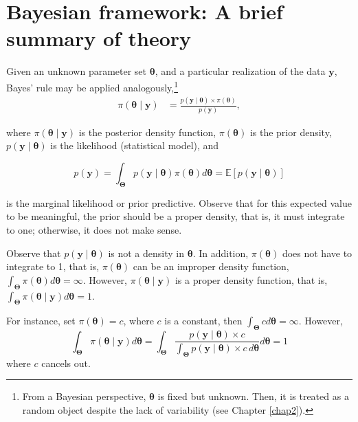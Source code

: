 \section{Bayesian framework: A brief summary of theory}\label{sec12}

Given an unknown parameter set \( \bm{\theta} \), and a particular realization of the data \( \mathbf{y} \), Bayes' rule may be applied analogously,\footnote{From a Bayesian perspective, \( \bm{\theta} \) is fixed but unknown. Then, it is treated as a random object despite the lack of variability (see Chapter \ref{chap2}).}
\begin{align}
	\pi(\bm{\theta}\mid \mathbf{y})&=\frac{p(\mathbf{y}\mid \bm{\theta}) \times \pi(\bm{\theta})}{p(\mathbf{y})},
	\label{eq:121}
\end{align}

where $\pi(\bm{\theta}\mid \mathbf{y})$ is the posterior density function, $\pi(\bm{\theta})$ is the prior density, $p(\mathbf{y}\mid \bm{\theta})$ is the likelihood (statistical model), and

\begin{equation}
	p(\mathbf{y})=\int_{\mathbf{\Theta}}p(\mathbf{y}\mid \bm{\theta})\pi(\bm{\theta})d\bm{\theta}=\mathbb{E}\left[p(\mathbf{y}\mid \bm{\theta})\right]
	\label{eq:121a}
\end{equation}

is the marginal likelihood or prior predictive. Observe that for this expected value to be meaningful, the prior should be a proper density, that is, it must integrate to one; otherwise, it does not make sense.


Observe that \( p(\mathbf{y} \mid \bm{\theta}) \) is not a density in \( \bm{\theta} \). In addition, \( \pi(\bm{\theta}) \) does not have to integrate to 1, that is, \( \pi(\bm{\theta}) \) can be an improper density function, \( \int_{\mathbf{\Theta}} \pi(\bm{\theta}) d\bm{\theta} = \infty \). However, \( \pi(\bm{\theta} \mid \mathbf{y}) \) is a proper density function, that is, \( \int_{\mathbf{\Theta}} \pi(\bm{\theta} \mid \mathbf{y}) d\bm{\theta} = 1 \). 

For instance, set \( \pi(\bm{\theta}) = c \), where \( c \) is a constant, then \( \int_{\mathbf{\Theta}} c d\bm{\theta} = \infty \). However,
\[
\int_{\mathbf{\Theta}} \pi(\bm{\theta} \mid \mathbf{y}) d\bm{\theta} = \int_{\mathbf{\Theta}} \frac{p(\mathbf{y} \mid \bm{\theta}) \times c}{\int_{\mathbf{\Theta}} p(\mathbf{y} \mid \bm{\theta}) \times c \, d\bm{\theta}} d\bm{\theta} = 1
\]
where \( c \) cancels out. 

